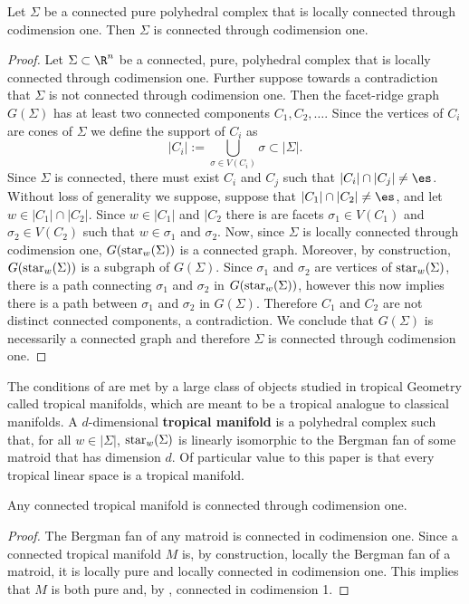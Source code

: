 \begin{proposition}\label{prop:connectedCodim1}
Let $\Sigma$ be a connected pure polyhedral complex that is locally connected through codimension one. Then $\Sigma$ is connected through codimension one.
\end{proposition}
\begin{proof}
    Let $\Sigma\subset \R^n$ be a connected, pure, polyhedral complex that is locally connected through codimension one. Further suppose towards a contradiction that $\Sigma$ is not connected through codimension one. Then the facet-ridge graph $G(\Sigma)$ has at least two connected components $C_1, C_2,\dots$. Since the vertices of $C_i$ are cones of $\Sigma$ we define the support of $C_i$ as
    $$|C_i|:= \bigcup_{\sigma\in V(C_i)} \sigma\subset |\Sigma|.$$
    Since $\Sigma$ is connected, there must exist $C_i$ and $C_j$ such that $|C_i|\cap |C_j|\neq \es$. Without loss of generality we suppose, suppose that $|C_1|\cap |C_2|\neq \es$, and let $w\in |C_1|\cap |C_2|$. Since $w\in |C_1|$ and $|C_2$ there is are facets  $\sigma_1\in V(C_1)$ and $\sigma_2\in V(C_2)$ such that $w\in \sigma_1$ and $\sigma_2$. Now, since $\Sigma$ is locally connected through codimension one, $G(\operatorname{star}_w(\Sigma))$ is a connected graph. Moreover, by construction, $G(\operatorname{star}_w(\Sigma))$ is a subgraph of $G(\Sigma)$. Since $\sigma_1$ and $\sigma_2$ are vertices of $\operatorname{star}_w(\Sigma)$, there is a path connecting $\sigma_1$ and $\sigma_2$ in $G(\operatorname{star}_w(\Sigma))$, however this now implies there is a path between $\sigma_1$ and $\sigma_2$ in $G(\Sigma)$. Therefore $C_1$ and $C_2$ are not distinct connected components, a contradiction. We conclude that $G(\Sigma)$ is necessarily a connected graph and therefore $\Sigma$ is connected through codimension one.
\end{proof}

The conditions of  are met by a large class of objects studied in tropical Geometry called tropical manifolds, which are meant to be a tropical analogue to classical manifolds. A $d$-dimensional \textbf{tropical manifold} is a polyhedral complex such that, for all $w\in |\Sigma|$, $\operatorname{star}_w(\Sigma)$ is linearly isomorphic to the Bergman fan of some matroid that has dimension $d$. Of particular value to this paper is that every tropical linear space is a tropical manifold.

\begin{corollary}\label{cor:connectedCodim1}
    Any connected tropical manifold is connected through codimension one.
\end{corollary}
\begin{proof}
    The Bergman fan of any matroid is connected in codimension one. Since a connected tropical manifold $M$ is, by construction, locally the Bergman fan of a matroid, it is locally pure and locally connected in codimension one. This implies that $M$ is both pure and, by , connected in codimension 1.
\end{proof}

